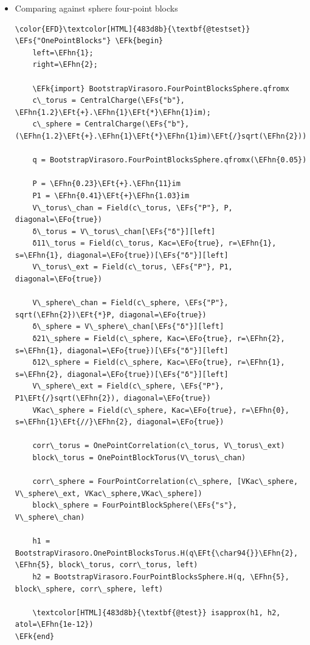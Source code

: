 \documentclass[a4paper]{article}
\numberwithin{equation}{section}
\newcommand{\EFs}[1]{\textcolor{EFs}{#1}} %
\newcommand{\EFk}[1]{\textcolor{EFk}{#1}} %
\newcommand{\EFt}[1]{\textcolor{EFt}{#1}} %
\newcommand{\EFo}[1]{\textcolor{EFo}{#1}} %
\newcommand{\EFhn}[1]{\textcolor{EFhn}{#1}} %
\begin{document}
\begin{itemize}
\item Comparing against sphere four-point blocks
\label{sec:orge69019e}

\begin{Code}
\begin{Verbatim}
\color{EFD}\textcolor[HTML]{483d8b}{\textbf{@testset}} \EFs{"OnePointBlocks"} \EFk{begin}
    left=\EFhn{1};
    right=\EFhn{2};

    \EFk{import} BootstrapVirasoro.FourPointBlocksSphere.qfromx
    c\_torus = CentralCharge(\EFs{"b"}, \EFhn{1.2}\EFt{+}.\EFhn{1}\EFt{*}\EFhn{1}im);
    c\_sphere = CentralCharge(\EFs{"b"}, (\EFhn{1.2}\EFt{+}.\EFhn{1}\EFt{*}\EFhn{1}im)\EFt{/}sqrt(\EFhn{2}))

    q = BootstrapVirasoro.FourPointBlocksSphere.qfromx(\EFhn{0.05})

    P = \EFhn{0.23}\EFt{+}.\EFhn{11}im
    P1 = \EFhn{0.41}\EFt{+}\EFhn{1.03}im
    V\_torus\_chan = Field(c\_torus, \EFs{"P"}, P, diagonal=\EFo{true})
    δ\_torus = V\_torus\_chan[\EFs{"δ"}][left]
    δ11\_torus = Field(c\_torus, Kac=\EFo{true}, r=\EFhn{1}, s=\EFhn{1}, diagonal=\EFo{true})[\EFs{"δ"}][left]
    V\_torus\_ext = Field(c\_torus, \EFs{"P"}, P1, diagonal=\EFo{true})

    V\_sphere\_chan = Field(c\_sphere, \EFs{"P"}, sqrt(\EFhn{2})\EFt{*}P, diagonal=\EFo{true})
    δ\_sphere = V\_sphere\_chan[\EFs{"δ"}][left]
    δ21\_sphere = Field(c\_sphere, Kac=\EFo{true}, r=\EFhn{2}, s=\EFhn{1}, diagonal=\EFo{true})[\EFs{"δ"}][left]
    δ12\_sphere = Field(c\_sphere, Kac=\EFo{true}, r=\EFhn{1}, s=\EFhn{2}, diagonal=\EFo{true})[\EFs{"δ"}][left]
    V\_sphere\_ext = Field(c\_sphere, \EFs{"P"}, P1\EFt{/}sqrt(\EFhn{2}), diagonal=\EFo{true})
    VKac\_sphere = Field(c\_sphere, Kac=\EFo{true}, r=\EFhn{0}, s=\EFhn{1}\EFt{//}\EFhn{2}, diagonal=\EFo{true})

    corr\_torus = OnePointCorrelation(c\_torus, V\_torus\_ext)
    block\_torus = OnePointBlockTorus(V\_torus\_chan)

    corr\_sphere = FourPointCorrelation(c\_sphere, [VKac\_sphere, V\_sphere\_ext, VKac\_sphere,VKac\_sphere])
    block\_sphere = FourPointBlockSphere(\EFs{"s"}, V\_sphere\_chan)

    h1 = BootstrapVirasoro.OnePointBlocksTorus.H(q\EFt{\char94{}}\EFhn{2}, \EFhn{5}, block\_torus, corr\_torus, left)
    h2 = BootstrapVirasoro.FourPointBlocksSphere.H(q, \EFhn{5}, block\_sphere, corr\_sphere, left)

    \textcolor[HTML]{483d8b}{\textbf{@test}} isapprox(h1, h2, atol=\EFhn{1e-12})
\EFk{end}
\end{Verbatim}
\end{Code}
\end{itemize}
\end{document}
